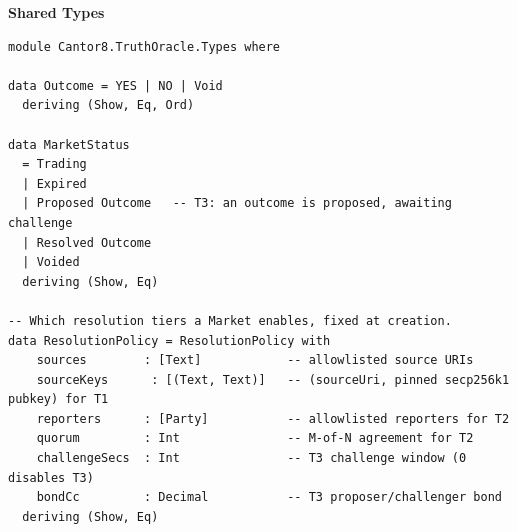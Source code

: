 \documentclass[11pt,a4paper]{article}
\begin{document}
\begin{center}
\textbf{Shared Types}
\end{center}
\begin{lstlisting}
module Cantor8.TruthOracle.Types where

data Outcome = YES | NO | Void
  deriving (Show, Eq, Ord)

data MarketStatus
  = Trading
  | Expired
  | Proposed Outcome   -- T3: an outcome is proposed, awaiting challenge
  | Resolved Outcome
  | Voided
  deriving (Show, Eq)

-- Which resolution tiers a Market enables, fixed at creation.
data ResolutionPolicy = ResolutionPolicy with
    sources        : [Text]            -- allowlisted source URIs
    sourceKeys      : [(Text, Text)]   -- (sourceUri, pinned secp256k1 pubkey) for T1
    reporters      : [Party]           -- allowlisted reporters for T2
    quorum         : Int               -- M-of-N agreement for T2
    challengeSecs  : Int               -- T3 challenge window (0 disables T3)
    bondCc         : Decimal           -- T3 proposer/challenger bond
  deriving (Show, Eq)
\end{lstlisting}
\end{document}
